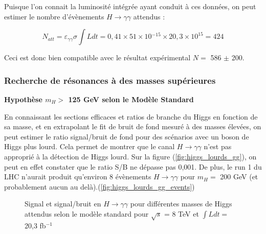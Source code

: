 \documentclass[11pt]{article} %
\begin{document}
Puisque l'on connait la luminosité intégrée ayant conduit à ces données, on peut estimer le nombre d'évènements $H \to \gamma\gamma$ attendus :

\begin{equation}
N_{att} = \varepsilon_{\gamma\gamma} \sigma \int L dt = 0,41 \times 51 \times  \mbox{10} {}^{-15} \times 20,3 \times 10^{15} = 424
\end{equation}

Ceci est donc bien compatible avec le résultat expérimental $N =$ 586 $\pm$ 200.



\subsubsection{Recherche de résonances à des masses supérieures }

\textbf{Hypothèse $m_H >$ 125 GeV selon le Modèle Standard}

En connaissant les sections efficaces et ratios de branche du Higgs en fonction de sa masse, et en extrapolant le fit de bruit de fond mesuré à des masses élevées, on peut estimer le ratio signal/bruit de fond pour des scénarios avec un boson de Higgs plus lourd. Cela permet de montrer que le canal $H \to \gamma \gamma$ n'est pas approprié à la détection de Higgs lourd. Sur la figure  (\ref{fig:higgs_lourds_gg}), on peut en effet constater que le ratio S/B ne dépasse pas 0,001. De plus, le run 1 du LHC n'aurait produit qu'environ 8 évènements $H \to \gamma \gamma$ pour $m_H =$ 200 GeV (et probablement aucun au delà).(\ref{fig:higgs_lourds_gg_events})
\begin{figure}[H]
\begin{subfigure}[b]{.5\linewidth}
\centering
 \resizebox{1.1\linewidth}{!}{}
\end{subfigure}%
\begin{subfigure}[b]{.5\linewidth}
\centering
 \resizebox{1.1\linewidth}{!}{}
\end{subfigure}
\caption{Signal et signal/bruit en $H\to\gamma\gamma$ pour différentes masses de Higgs attendus selon le modèle standard pour $\sqrt{s}$ = 8 TeV et $\int Ldt =$ 20,3 fb${}^{-1}$ }
\end{figure}
\end{document}
